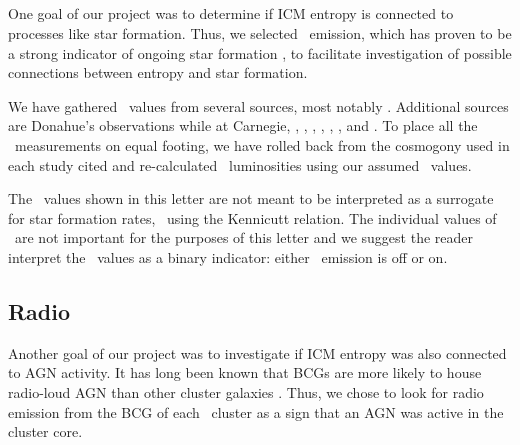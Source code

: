 \documentclass{emulateapj}
\begin{document}
\subsection{\halpha}
\label{sec:ha}

One goal of our project was to determine if ICM entropy is connected
to processes like star formation. Thus, we selected \halpha\ emission,
which has proven to be a strong indicator of ongoing star formation
\citep{kennicuttrelation}, to facilitate investigation of possible
connections between entropy and star formation.

We have gathered \halpha\ values from several sources, most notably
\cite{crawford99}. Additional sources are Donahue's observations while
at Carnegie, \cite{heckman89}, \cite{dsg92}, \cite{lawrence96},
\cite{1996AJ....112.1390V}, \cite{white97},
\cite{2005MNRAS.363..216C}, and \cite{ir_quillen}. To place all the
\halpha\ measurements on equal footing, we have rolled back from the
cosmogony used in each study cited and re-calculated
\halpha\ luminosities using our assumed \LCDM\ values.

The \lha\ values shown in this letter are not meant to be interpreted
as a surrogate for star formation rates, \eg\ using the Kennicutt
relation. The individual values of \lha\ are not important for the
purposes of this letter and we suggest the reader interpret the
\lha\ values as a binary indicator: either \halpha\ emission is off or
on.

\subsection{Radio}
\label{sec:radio}

Another goal of our project was to investigate if ICM entropy was also
connected to AGN activity. It has long been known that BCGs are more
likely to house radio-loud AGN than other cluster galaxies
\citep{burns81, valentijn83, burns90}. Thus, we chose to look for
radio emission from the BCG of each \accept\ cluster as a sign that an
AGN was active in the cluster core.
\end{document}
